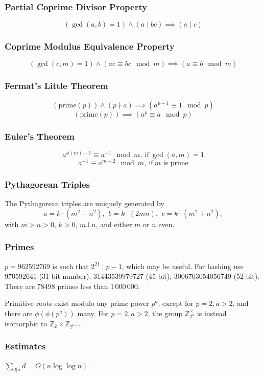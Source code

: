 \documentclass[
	a4paper,
	landscape,
	10pt,
]{article}
\begin{document}
\begin{multicols}{3}
        \subsubsection*{Partial Coprime Divisor Property}
        $$
        (\gcd(a,b)=1) \land (a \mid bc) \implies (a \mid c)
        $$
        \subsubsection*{Coprime Modulus Equivalence Property}
        $$
        (\gcd(c,m)=1) \land (ac \equiv bc \mod m) \implies (a \equiv b \mod m)
        $$
        \subsubsection*{Fermat's Little Theorem}
        $$
        (\text{prime}(p)) \land (p \nmid a) \implies (a^{p-1} \equiv 1 \mod p)
        $$
        $$
        (\text{prime}(p)) \implies (a^p \equiv a \mod p) 
        $$
		\subsubsection*{Euler's Theorem}
		$$
		a^{\phi(m)-1} \equiv a^{-1} \mod m,~ \text{if}~ \gcd(a,m) = 1
		$$
		$$
		a^{-1} \equiv a^{m-2} \mod m,~ \text{if}~ m \text{ is prime}
		$$


\subsubsection*{Pythagorean Triples}
 The Pythagorean triples are uniquely generated by
 \[ a=k\cdot (m^{2}-n^{2}),\ \,b=k\cdot (2mn),\ \,c=k\cdot (m^{2}+n^{2}), \]
 with $m > n > 0$, $k > 0$, $m \bot n$, and either $m$ or $n$ even.

\subsubsection*{Primes}
	$p=962592769$ is such that $2^{21} \mid p-1$, which may be useful. For hashing
	use 970592641 (31-bit number), 31443539979727 (45-bit), 3006703054056749
	(52-bit). There are 78498 primes less than 1\,000\,000.

	Primitive roots exist modulo any prime power $p^a$, except for $p = 2, a > 2$, and there are $\phi(\phi(p^a))$ many.
	For $p = 2, a > 2$, the group $\mathbb Z_{2^a}^\times$ is instead isomorphic to $\mathbb Z_2 \times \mathbb Z_{2^{a-2}}$.

\subsubsection*{Estimates}
	$\sum_{d|n} d = O(n \log \log n)$.


\end{multicols}
\end{document}
